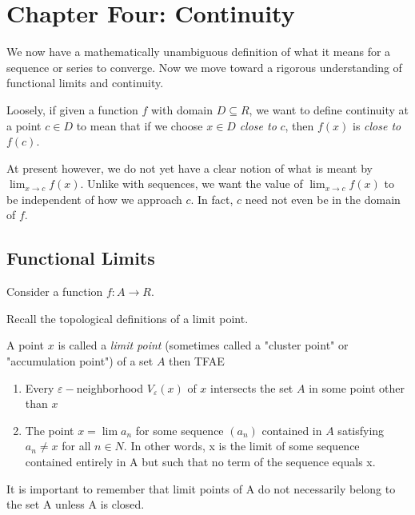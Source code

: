 \documentclass{tufte-book}
\theoremstyle{definition}
\numberwithin{section}{chapter}
\begin{document}

\setcounter{chapter}{4}
\chapter{Chapter Four: Continuity}


\setcounter{section}{0}
\setcounter{theorem}{0}
\setcounter{definition}{0}


We now have a mathematically unambiguous definition of what it means for a sequence or series to converge.  Now we move toward a rigorous understanding of functional limits and continuity.

Loosely, if given a function $f$ with domain $D \subseteq R$, we want to define continuity at a point $c \in D$ to mean that if we choose $x \in D$ \emph{close to} $c$, then $f(x)$ is \emph{close to} $f(c)$.

At present however, we do not yet have a clear notion of what is meant by $\lim_{x \to c} f(x)$.  Unlike with sequences,  we want the value of $\lim_{x \to c} f(x)$ to be independent of how we approach $c$.  In fact, $c$ need not even be in the domain of $f$.   

\section{Functional Limits}

Consider a function $f: A \to R$.

Recall the topological definitions of a limit point.

A point $x$ is called a \emph{limit point} (sometimes called a "cluster point" or "accumulation point") of a set $A$ then TFAE 

\begin{enumerate}
	\item Every $\varepsilon-$neighborhood $V_{\varepsilon}(x)$ of $x$ intersects the set $A$ in some point other than $x$
	\item The point $x = \lim a_n$ for some sequence $(a_n)$ contained in $A$ satisfying $a_n \neq x$ for all $n \in N$.  In other words, x is the limit of some sequence contained entirely in A but such that no term of the sequence equals x.  
\end{enumerate}

It is important to remember that limit points of A do not necessarily belong to the set A unless A is closed.
\end{document}
